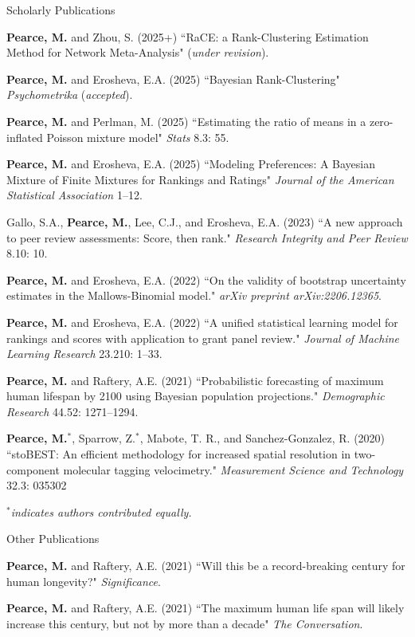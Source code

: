 \documentclass{resume} %
\begin{document}
\begin{rSection}{Scholarly Publications}

\textbf{Pearce, M.} and Zhou, S. (2025+) ``RaCE: a Rank-Clustering Estimation Method for Network Meta-Analysis" (\textit{under revision}).

\textbf{Pearce, M.} and Erosheva, E.A. (2025) ``Bayesian Rank-Clustering" \textit{Psychometrika} (\textit{accepted}).

\textbf{Pearce, M.} and Perlman, M. (2025) ``Estimating the ratio of means in a zero-inflated Poisson mixture model" \textit{Stats} 8.3: 55.

\textbf{Pearce, M.} and Erosheva, E.A. (2025) ``Modeling Preferences: A Bayesian Mixture of Finite Mixtures for Rankings and Ratings" \textit{Journal of the American Statistical Association} 1--12.

Gallo, S.A., \textbf{Pearce, M.}, Lee, C.J., and Erosheva, E.A. (2023) ``A new approach to peer review assessments: Score, then rank." \textit{Research Integrity and Peer Review} 8.10: 10.

\textbf{Pearce, M.} and Erosheva, E.A. (2022) ``On the validity of bootstrap uncertainty estimates in the Mallows-Binomial model." \textit{arXiv preprint arXiv:2206.12365}.

\textbf{Pearce, M.} and Erosheva, E.A. (2022) ``A unified statistical learning model for rankings and scores with application to grant panel review." \textit{Journal of Machine Learning Research} 23.210: 1--33.

\textbf{Pearce, M.} and Raftery, A.E. (2021) ``Probabilistic forecasting of maximum human lifespan by 2100 using Bayesian population projections." {\em Demographic Research} 44.52: 1271--1294.

\textbf{Pearce, M.}$^*$, Sparrow, Z.$^*$, Mabote, T. R., and Sanchez-Gonzalez, R. (2020) ``stoBEST: An efficient methodology for increased spatial resolution in two-component molecular tagging velocimetry." {\em Measurement Science and Technology} 32.3: 035302

{\em $^*$indicates authors contributed equally.}
\end{rSection}

\begin{rSection}{Other Publications}

\textbf{Pearce, M.} and Raftery, A.E. (2021) ``Will this be a record-breaking century for human longevity?" {\em Significance}.

\textbf{Pearce, M.} and Raftery, A.E. (2021) ``The maximum human life span will likely increase this century, but not by more than a decade" {\em The Conversation}.

\end{rSection}
\end{document}
